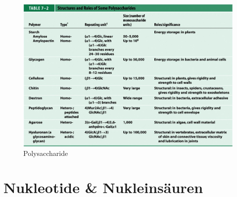 \documentclass[a4paper,twocolumn,usegeometry,english,fontsize=6,DIV=16]{scrartcl}
\begin{document}
\begin{figure}
	\centering
	\includegraphics[width=\linewidth]{img/polysaccharide.png}
	\caption{Polysaccharide}
\end{figure}

\section{Nukleotide \& Nukleinsäuren}
\end{document}
